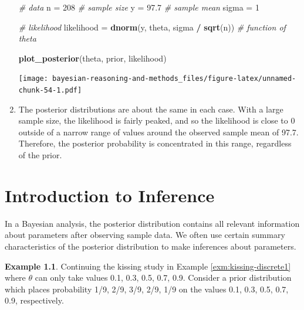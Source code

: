 \documentclass[
]{book}
\newenvironment{Shaded}{\begin{snugshade}}{\end{snugshade}}
\newcommand{\CommentTok}[1]{\textcolor[rgb]{0.56,0.35,0.01}{\textit{#1}}}
\newcommand{\DecValTok}[1]{\textcolor[rgb]{0.00,0.00,0.81}{#1}}
\newcommand{\FloatTok}[1]{\textcolor[rgb]{0.00,0.00,0.81}{#1}}
\newcommand{\KeywordTok}[1]{\textcolor[rgb]{0.13,0.29,0.53}{\textbf{#1}}}
\newcommand{\NormalTok}[1]{#1}
\newcommand{\OperatorTok}[1]{\textcolor[rgb]{0.81,0.36,0.00}{\textbf{#1}}}
\newcommand{\StringTok}[1]{\textcolor[rgb]{0.31,0.60,0.02}{#1}}
\theoremstyle{definition}
\theoremstyle{definition}
\newtheorem{example}{Example}[chapter]
\theoremstyle{definition}
\theoremstyle{remark}
\begin{document}
\begin{enumerate}
\begin{Shaded}
\begin{Highlighting}[]
\CommentTok{\# data}
\NormalTok{n =}\StringTok{ }\DecValTok{208} \CommentTok{\# sample size}
\NormalTok{y =}\StringTok{ }\FloatTok{97.7} \CommentTok{\# sample mean}
\NormalTok{sigma =}\StringTok{ }\DecValTok{1}

\CommentTok{\# likelihood}
\NormalTok{likelihood =}\StringTok{ }\KeywordTok{dnorm}\NormalTok{(y, theta, sigma }\OperatorTok{/}\StringTok{ }\KeywordTok{sqrt}\NormalTok{(n)) }\CommentTok{\# function of theta}

\KeywordTok{plot\_posterior}\NormalTok{(theta, prior, likelihood)}
\end{Highlighting}
\end{Shaded}

  \texttt{[image: bayesian-reasoning-and-methods\_files/figure-latex/unnamed-chunk-54-1.pdf]}
\item
  The posterior distributions are about the same in each case. With a large sample size, the likelihood is fairly peaked, and so the likelihood is close to 0 outside of a narrow range of values around the observed sample mean of 97.7. Therefore, the posterior probability is concentrated in this range, regardless of the prior.
\end{enumerate}

\hypertarget{inference}{%
\chapter{Introduction to Inference}\label{inference}}

In a Bayesian analysis, the posterior distribution contains all relevant information about parameters after observing sample data. We often use certain summary characteristics of the posterior distribution to make inferences about parameters.

\begin{example}
\protect\hypertarget{exm:kissing-summary}{}{\label{exm:kissing-summary} }
Continuing the kissing study in Example \ref{exm:kissing-discrete1} where \(\theta\) can only take values 0.1, 0.3, 0.5, 0.7, 0.9.
Consider a prior distribution which places probability 1/9, 2/9, 3/9, 2/9, 1/9 on the values 0.1, 0.3, 0.5, 0.7, 0.9, respectively.
\end{example}
\end{document}
